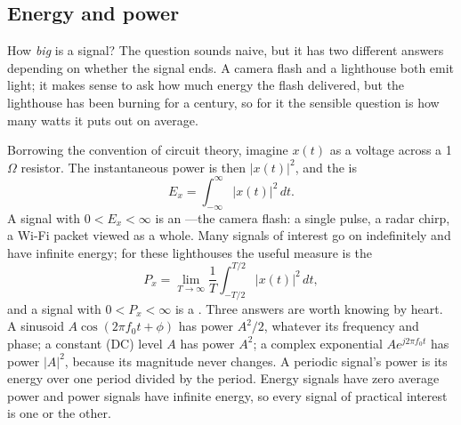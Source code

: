\subsection{Energy and power}
\label{sec:ch02:energypower}

How \emph{big} is a signal? The question sounds naive, but it has two different answers depending
on whether the signal ends. A camera flash and a lighthouse both emit light; it makes sense to ask
how much energy the flash delivered, but the lighthouse has been burning for a century, so for it
the sensible question is how many watts it puts out on average.

Borrowing the convention of circuit theory, imagine $x(t)$ as a voltage across a 1\,$\Omega$
resistor. The instantaneous power is then $|x(t)|^2$, and the  is
\begin{equation}
E_x=\int_{-\infty}^{\infty}|x(t)|^2\,dt .
\label{eq:ch02:energy}
\end{equation}
A signal with $0<E_x<\infty$ is an ---the camera flash: a single pulse, a radar
chirp, a Wi-Fi packet viewed as a whole. Many signals of interest go on indefinitely and have
infinite energy; for these lighthouses the useful measure is the 
\begin{equation}
P_x=\lim_{T\to\infty}\frac{1}{T}\int_{-T/2}^{T/2}|x(t)|^2\,dt ,
\label{eq:ch02:power}
\end{equation}
and a signal with $0<P_x<\infty$ is a . Three answers are worth knowing by
heart. A sinusoid $A\cos(2\pi f_0 t+\phi)$ has power $A^2/2$, whatever its frequency and phase; a
constant (DC) level $A$ has power $A^2$; a complex exponential $Ae^{j2\pi f_0t}$ has power $|A|^2$,
because its magnitude never changes. A periodic signal's power is its energy over one period divided
by the period. Energy signals have zero average power and power signals have infinite energy, so
every signal of practical interest is one or the other.


